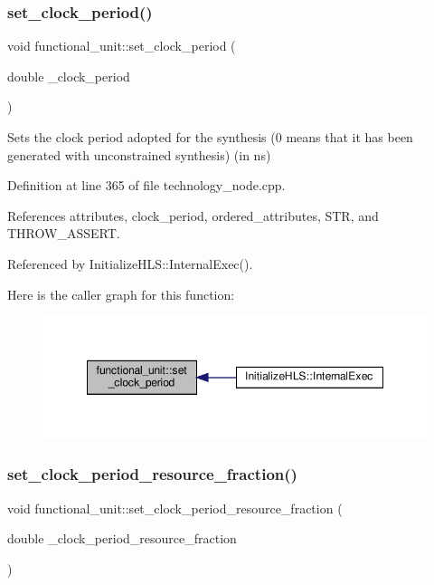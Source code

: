 \subsubsection{\texorpdfstring{set\+\_\+clock\+\_\+period()}{set\_clock\_period()}}
{\footnotesize\ttfamily void functional\+\_\+unit\+::set\+\_\+clock\+\_\+period (\begin{DoxyParamCaption}\item[{double}]{\+\_\+clock\+\_\+period }\end{DoxyParamCaption})}



Sets the clock period adopted for the synthesis (0 means that it has been generated with unconstrained synthesis) (in ns) 



Definition at line 365 of file technology\+\_\+node.\+cpp.



References attributes, clock\+\_\+period, ordered\+\_\+attributes, S\+TR, and T\+H\+R\+O\+W\+\_\+\+A\+S\+S\+E\+RT.



Referenced by Initialize\+H\+L\+S\+::\+Internal\+Exec().

Here is the caller graph for this function\+:
\nopagebreak
\begin{figure}[H]
\begin{center}
\leavevmode
\includegraphics[width=348pt]{d8/dd6/structfunctional__unit_a99dbc918a7d0b2a6ba20ac4161961a64_icgraph}
\end{center}
\end{figure}
\mbox{\label{structfunctional__unit_af2184fccfe63e8b0d8b9768d242f5558}} 
\subsubsection{\texorpdfstring{set\+\_\+clock\+\_\+period\+\_\+resource\+\_\+fraction()}{set\_clock\_period\_resource\_fraction()}}
{\footnotesize\ttfamily void functional\+\_\+unit\+::set\+\_\+clock\+\_\+period\+\_\+resource\+\_\+fraction (\begin{DoxyParamCaption}\item[{double}]{\+\_\+clock\+\_\+period\+\_\+resource\+\_\+fraction }\end{DoxyParamCaption})}



